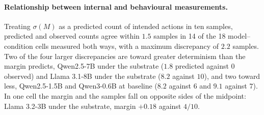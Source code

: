 \paragraph{Relationship between internal and behavioural measurements.}
Treating $\sigma(M)$ as a predicted count of intended actions in ten samples,
predicted and observed counts agree within $1.5$ samples in 14 of the 18
model--condition cells measured both ways, with a maximum discrepancy of $2.2$
samples. Two of the four larger discrepancies are toward greater determinism than
the margin predicts, Qwen2.5-7B under the substrate ($1.8$ predicted against $0$
observed) and Llama 3.1-8B under the substrate ($8.2$ against $10$), and two toward
less, Qwen2.5-1.5B and Qwen3-0.6B at baseline ($8.2$ against $6$ and $9.1$ against
$7$). In one cell the margin and the samples fall on opposite sides of the midpoint:
Llama 3.2-3B under the substrate, margin $+0.18$ against $4/10$.
